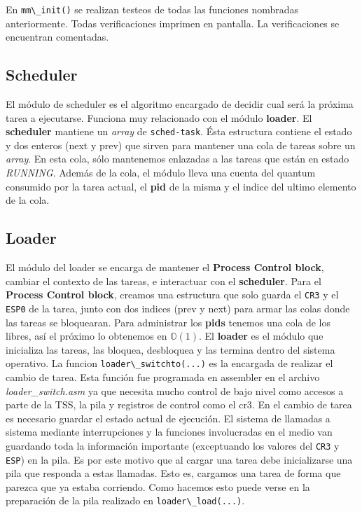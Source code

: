 \documentclass[a4paper]{article}
\newcommand{\file}[1]{\textit{#1}}
\newcommand{\func}[1]{\lstinline{#1}}
\begin{document}
En \func{mm\_init()} se realizan testeos de todas las funciones nombradas anteriormente. Todas verificaciones imprimen en pantalla. La verificaciones se encuentran comentadas. 

\subsection{Scheduler}
El módulo de scheduler es el algoritmo encargado de decidir cual será la próxima tarea a ejecutarse. Funciona muy relacionado con el módulo \textbf{loader}. El \textbf{scheduler} mantiene un \textit{array} de \func{sched-task}. Ésta estructura contiene el estado y dos enteros (next y prev) que sirven para mantener una cola de tareas sobre un \textit{array}.
En esta cola, sólo mantenemos enlazadas a las tareas que están en estado \textit{RUNNING}.
Además de la cola, el módulo lleva una cuenta del quantum consumido por la tarea actual, el \textbf{pid} de la misma y el indice del ultimo elemento de la cola.

\subsection{Loader}
El módulo del loader se encarga de mantener el \textbf{Process Control block}, cambiar el contexto de las tareas, e interactuar con el \textbf{scheduler}.
Para el \textbf{Process Control block}, creamos una estructura que solo guarda el \func{CR3} y el \func{ESP0} de la tarea, junto con dos indices (prev y next) para armar las colas donde las tareas se bloquearan.
Para administrar los \textbf{pids} tenemos una cola de los libres, así el próximo lo obtenemos en $\mathbb{O}(1)$.
El \textbf{loader} es el módulo que inicializa las tareas, las bloquea, desbloquea y las termina dentro del sistema operativo.
La funcion \func{loader\_switchto(...)} es la encargada de realizar el cambio de tarea. Esta función fue programada en assembler en el archivo \file{loader\_switch.asm} ya que necesita mucho control de bajo nivel como accesos a parte de la TSS, la pila y registros de control como el cr3. En el cambio de tarea es necesario guardar el estado actual de ejecución. El sistema de llamadas a sistema mediante interrupciones y la funciones involucradas en el medio van guardando toda la información importante (exceptuando los valores del \func{CR3} y \func{ESP}) en la pila. Es por este motivo que al cargar una tarea debe inicializarse una pila que responda a estas llamadas. Esto es, cargamos una tarea de forma que parezca que ya estaba corriendo. Como hacemos esto puede verse en la preparación de la pila realizado en \func{loader\_load(...)}. 
\end{document}
